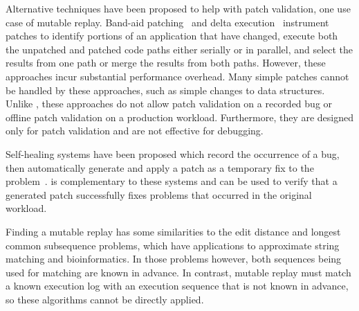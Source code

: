 Alternative techniques have been proposed to help with patch validation, one
use case of mutable replay.
Band-aid
patching~\cite{bandaid} and delta execution~\cite{delta} instrument patches to
identify portions of an application that have changed, execute both
the unpatched and patched code paths either serially or in parallel,
and select the results from one path or merge the results from both
paths. However, these approaches incur substantial performance overhead.
Many simple patches cannot be handled by these
approaches, such as simple changes to data structures. Unlike {\dora},
these approaches do not allow patch validation on a recorded bug or offline
patch validation on a production workload.
Furthermore, they are designed only for patch validation and are not effective for
debugging.

Self-healing systems have been proposed which 
record the occurrence of a bug, then automatically generate and apply
a patch as a temporary fix to the problem~\cite{assure:asplos09}.
{\dora} is complementary
to these systems and can be used to
verify that a generated patch successfully fixes
problems that occurred in the original workload.

Finding a mutable replay has some similarities
to the edit distance and longest common subsequence
problems, which have applications to approximate string matching and
bioinformatics. In those problems however, both
sequences being used for matching are known in advance. In contrast,
mutable replay must match a known execution log with an
execution sequence that is not known in advance, so these algorithms cannot be
directly applied.
